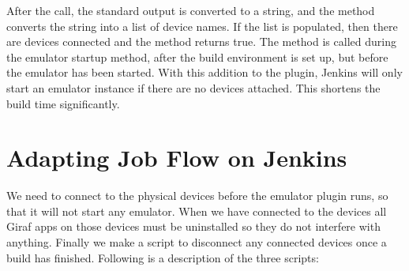 After the call, the standard output is converted to a string, and the method  converts the string into a list of device names. If the list is populated, then there are devices connected and the method returns true. The method  is called during the emulator startup method, after the build environment is set up, but before the emulator has been started. With this addition to the plugin, Jenkins will only start an emulator instance if there are no devices attached. This shortens the build time significantly.

\section{Adapting Job Flow on Jenkins}\label{sec:adapting_job_flow}
We need to connect to the physical devices before the emulator plugin runs, so that it will not start any emulator. When we have connected to the devices all Giraf apps on those devices must be uninstalled so they do not interfere with anything. Finally we make a script to disconnect any connected devices once a build has finished. Following is a description of the three scripts:

